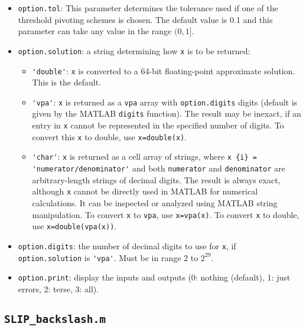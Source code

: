 \documentclass[12pt]{article}
\theoremstyle{definition}
\begin{document}
\begin{itemize}
\item \verb|option.tol|: This parameter determines the tolerance used if one of
the threshold pivoting schemes is chosen. The default value is 0.1 and this
parameter can take any value in the range $(0,1]$.

\item \verb|option.solution|:
    a string determining how \verb|x| is to be returned:

    \begin{itemize}
        \item \verb|'double'|:  \verb|x| is converted to a 64-bit
            floating-point approximate solution.  This is the default.
        \item \verb|'vpa'|:  \verb|x| is returned as a \verb|vpa| array with
            \verb|option.digits| digits (default is given by the MATLAB
            \verb|digits| function).  The result may be inexact, if an entry in
            \verb|x| cannot be represented in the specified number of digits.
            To convert this \verb|x| to double, use \verb|x=double(x)|.
        \item \verb|'char'|:  \verb|x| is returned as a cell array of strings,
            where \verb|x {i} =| \newline \verb|'numerator/denominator'| and both
            \verb|numerator| and \verb|denominator| are arbitrary-length
            strings of decimal digits.  The result is always exact, although
            \verb|x| cannot be directly used in MATLAB for numerical
            calculations.  It can be inspected or analyzed using MATLAB string
            manipulation.  To convert \verb|x| to \verb|vpa|, use
            \verb|x=vpa(x)|.  To convert \verb|x| to double, use
            \verb|x=double(vpa(x))|.
    \end{itemize}

\item \verb|option.digits|: the number of decimal digits to use for \verb|x|, if
        \verb|option.solution| is \verb|'vpa'|.  Must be in range 2 to $2^{29}$.

\item \verb|option.print|: display the inputs and outputs
        (0: nothing (default), 1: just errors, 2: terse, 3: all).

\end{itemize}

\cprotect\subsection{\verb|SLIP_backslash.m|}
\label{s:Use:MATLAB:factor}
\end{document}
